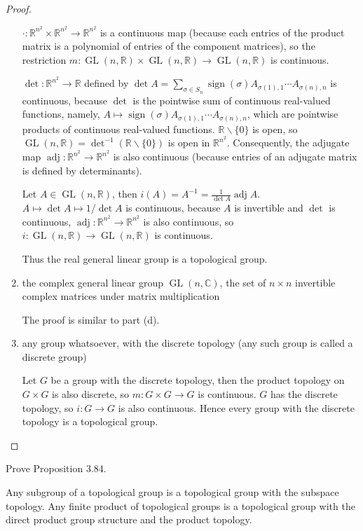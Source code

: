 \begin{proof}
\begin{enumerate}[label={(\alph*)}]
		      $\cdot: \mathbb{R}^{n^{2}}\times \mathbb{R}^{n^{2}}\to \mathbb{R}^{n^{2}}$ is a continuous map (because each entries of the product matrix is a polynomial of entries of the component matrices), so the restriction $m: \operatorname{GL}(n, \mathbb{R})\times\operatorname{GL}(n, \mathbb{R})\to \operatorname{GL}(n, \mathbb{R})$ is continuous.

		      $\det: \mathbb{R}^{n^{2}}\to \mathbb{R}$ defined by $\det A = \sum_{\sigma\in S_{n}}\operatorname{sign}(\sigma)A_{\sigma(1),1}\cdots A_{\sigma(n),n}$ is continuous, because $\det$ is the pointwise sum of continuous real-valued functions, namely, $A\mapsto \operatorname{sign}(\sigma)A_{\sigma(1),1}\cdots A_{\sigma(n),n}$, which are pointwise products of continuous real-valued functions. $\mathbb{R}\smallsetminus\{0\}$ is open, so $\operatorname{GL}(n, \mathbb{R}) = \det^{-1}(\mathbb{R}\smallsetminus\{0\})$ is open in $\mathbb{R}^{n^{2}}$. Consequently, the adjugate map $\operatorname{adj}: \mathbb{R}^{n^{2}}\to \mathbb{R}^{n^{2}}$ is also continuous (because entries of an adjugate matrix is defined by determinants).

		      Let $A\in \operatorname{GL}(n, \mathbb{R})$, then $i(A) = A^{-1} = \frac{1}{\det A}\operatorname{adj}A$. $A\mapsto \det A\mapsto 1/\det A$ is continuous, because $A$ is invertible and $\det$ is continuous, $\operatorname{adj}: \mathbb{R}^{n^{2}}\to \mathbb{R}^{n^{2}}$ is also continuous, so $i: \operatorname{GL}(n, \mathbb{R})\to \operatorname{GL}(n, \mathbb{R})$ is continuous.

		      Thus the real general linear group is a topological group.
		\item the complex general linear group $\operatorname{GL}(n, \mathbb{C})$, the set of $n\times n$ invertible complex matrices under matrix multiplication

		      The proof is similar to part (d).
		\item any group whatsoever, with the discrete topology (any such group is called a discrete group)

		      Let $G$ be a group with the discrete topology, then the product topology on $G\times G$ is also discrete, so $m: G\times G\to G$ is continuous. $G$ has the discrete topology, so $i: G\to G$ is also continuous. Hence every group with the discrete topology is a topological group.
	\end{enumerate}
\end{proof}

\begin{exercise}{3.85}
	Prove Proposition 3.84.

	Any subgroup of a topological group is a topological group with the subspace topology. Any finite product of topological groups is a topological group with the direct product group structure and the product topology.
\end{exercise}

